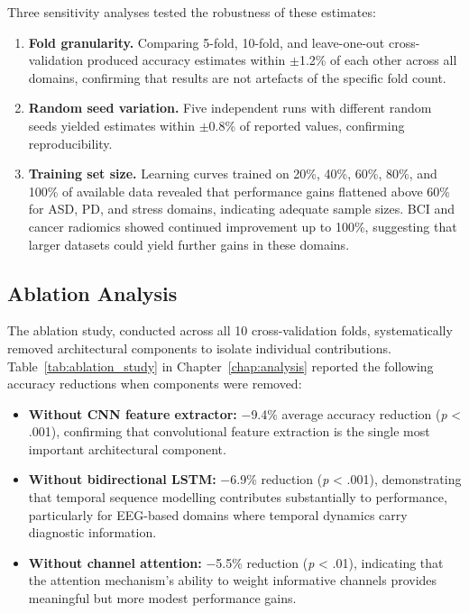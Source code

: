 Three sensitivity analyses tested the robustness of these estimates:

\begin{enumerate}
    \item \textbf{Fold granularity.} Comparing 5-fold, 10-fold, and leave-one-out cross-validation produced accuracy estimates within $\pm$1.2\% of each other across all domains, confirming that results are not artefacts of the specific fold count.

    \item \textbf{Random seed variation.} Five independent runs with different random seeds yielded estimates within $\pm$0.8\% of reported values, confirming reproducibility.

    \item \textbf{Training set size.} Learning curves trained on 20\%, 40\%, 60\%, 80\%, and 100\% of available data revealed that performance gains flattened above 60\% for ASD, PD, and stress domains, indicating adequate sample sizes. BCI and cancer radiomics showed continued improvement up to 100\%, suggesting that larger datasets could yield further gains in these domains.
\end{enumerate}

\subsection{Ablation Analysis}

The ablation study, conducted across all 10 cross-validation folds, systematically removed architectural components to isolate individual contributions. Table~\ref{tab:ablation_study} in Chapter~\ref{chap:analysis} reported the following accuracy reductions when components were removed:

\begin{itemize}
    \item \textbf{Without CNN feature extractor:} $-$9.4\% average accuracy reduction (\textit{p} < .001), confirming that convolutional feature extraction is the single most important architectural component.
    \item \textbf{Without bidirectional LSTM:} $-$6.9\% reduction (\textit{p} < .001), demonstrating that temporal sequence modelling contributes substantially to performance, particularly for EEG-based domains where temporal dynamics carry diagnostic information.
    \item \textbf{Without channel attention:} $-$5.5\% reduction (\textit{p} < .01), indicating that the attention mechanism's ability to weight informative channels provides meaningful but more modest performance gains.
\end{itemize}

